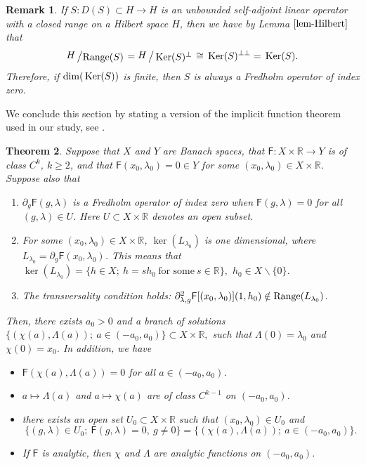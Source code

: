 \documentclass[12pt,reqno]{amsart}
\newcommand{\Ker}{{\rm \,Ker}}
\newcommand{\bigslant}[2]{{\raisebox{.1em}{$#1$}\left/\raisebox{-.1em}{$#2$}\right.}}
\numberwithin{equation}{section}
\numberwithin{figure}{section}
\newtheorem{theorem}{Theorem}[section]
\newtheorem{remark}[theorem]{Remark}
\begin{document}
	\begin{remark}\label{rem1} 
		If $S:D(S)\subset H\rightarrow H$ is an unbounded self-adjoint linear operator with a closed range on a Hilbert space $H$, then we have by Lemma $\ref{lem-Hilbert}$ that 
		$$
		\bigslant{H}{{\rm Range}(S)}= \bigslant{H}{\Ker(S)^{\bot}}\cong\Ker(S)^{{\bot}{\bot}}=\Ker(S).
		$$ 
		Therefore, if ${\rm dim}(\Ker(S))$ is finite, then $S$ is always a Fredholm operator of index zero. 
	\end{remark}
	
	We conclude this section by stating a version of the implicit 
	function theorem used in our study, see \cite[Theorem 8.3.1]{buffoni-toland}. 
	
	\begin{theorem}\label{TCR} 
		Suppose that $X$ and $Y$ are Banach spaces, that $\mathsf{F}: X\times \mathbb{R}\rightarrow Y$ is of class $C^k$, $k\geq2$, and that $\mathsf{F}(x_0,\lambda_0)=0\in Y$ for some $(x_0,\lambda_0) \in X\times \mathbb{R}$. Suppose also that
		\begin{enumerate}
			\item $\partial_g\mathsf{F}(g,\lambda)$ is a Fredholm operator of index zero when $\mathsf{F}(g,\lambda)=0$ for all $(g,\lambda)\in U$. Here $U\subset X\times\mathbb{R}$ denotes an open subset.
			\item For some $(x_0,\lambda_0)\in X\times\mathbb{R}$, $\ker(L_{\lambda_0})$ is one dimensional, where $L_{\lambda_0}=\partial_g\mathsf{F}(x_0,\lambda_0)$. This means that
			$\ker(L_{\lambda_0})=\{h\in X;\ h=sh_0\ \mbox{for some}\ s\in\mathbb{R}\},$ $h_0\in X\backslash\{0\}$.
			\item The transversality condition holds: $\partial_{\lambda,g}^2\mathsf{F}[(x_0,\lambda_0)](1,h_0)\notin {\rm{Range}}(L_{\lambda_0})$.
		\end{enumerate} 
		Then, there exists $a_0>0$ and a branch of solutions 
		$\{(\chi(a),\Lambda(a));\ a\in (-a_0,a_0) \}\subset X\times\mathbb{R},$
		such that $\Lambda(0)=\lambda_0$ and $\chi(0)=x_0$. In addition, we have
		\begin{itemize}
			\item $\mathsf{F}(\chi(a),\Lambda(a))=0$ for all $a\in (-a_0,a_0)$.
			\item $a\mapsto\Lambda(a)$ and $a\mapsto \chi(a)$ are of class $C^{k-1}$ on $(-a_0,a_0)$.
			\item there exists an open set $U_0\subset  X\times \mathbb{R}$ such that $(x_0,\lambda_0)\in U_0$ and 
			$$\{(g,\lambda)\in U_0;\ \mathsf{F}(g,\lambda)=0,\ g\neq0\}=\{(\chi(a),\Lambda(a));\ a \in (-a_0,a_0) \}.
			$$
			\item If $\mathsf{F}$ is analytic, then  $\chi$ and $\Lambda$ are analytic functions on $(-a_0,a_0)$.					
		\end{itemize}
	\end{theorem}
\end{document}
